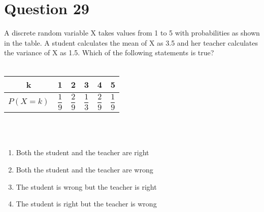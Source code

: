 \documentclass[journal,12pt,twocolumn]{IEEEtran}
\begin{document}
\section*{Question 29}
A discrete random variable X takes values from 1 to 5 with probabilities as shown in the table. A student calculates the mean of X as 3.5 and her teacher calculates the variance of X as 1.5. Which of the following statements is true?
\\\\
\begin{tabular}{|c|c|c|c|c|c|}
    \hline
    k &  1 & 2 & 3 & 4 & 5\\
    \hline
    $P(X = k)$ & $\dfrac{1}{9}$ & $\dfrac{2}{9}$& $\dfrac{1}{3}$ & $\dfrac{2}{9}$ & $\dfrac{1}{9}$\\
    \hline
\end{tabular}
\\\\
\begin{enumerate}[label=\Alph*)]
    \item Both the student and the teacher are right
    \item Both the student and the teacher are wrong
    \item The student is wrong but the teacher is right
    \item The student is right but the teacher is wrong
\end{enumerate}
\end{document}
